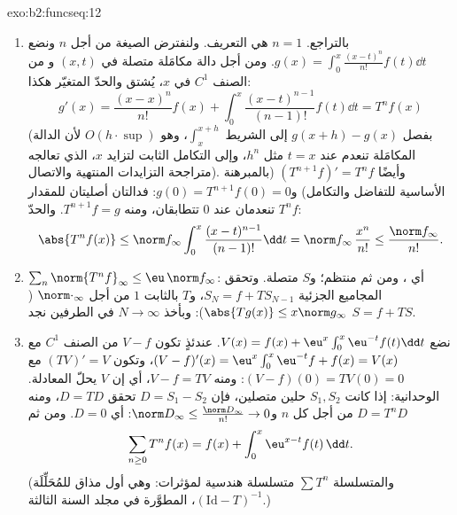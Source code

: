 \begin{solution}{exo:b2:funcseq:12}
\begin{enumerate}
  \item بالتراجع. $n = 1$ هي التعريف. ولنفترض الصيغة
        من أجل $n$ ونضع $g(x) = \int_0^x \frac{(x-t)^n}{n!}
        f(t)\dd t$. ومن أجل دالة مكامَلة متصلة في $(x,t)$ و
        من الصنف $C^1$ في $x$، يُشتق  والحدّ المتغيّر
        هكذا:
        \[
        g'(x) = \frac{(x-x)^n}{n!}f(x)
        + \int_0^x \frac{(x-t)^{n-1}}{(n-1)!}f(t)\dd t
        = T^nf(x)
        \]
        (بفصل $g(x+h) - g(x)$ إلى الشريط
        $\int_x^{x+h}$، وهو $O(h\cdot\sup)$ لأن الدالة المكامَلة تنعدم عند $t = x$ مثل $h^n$، وإلى
        التكامل الثابت لتزايد $x$، الذي تعالجه متراجحة التزايدات
        المنتهية والاتصال). وأيضًا $(T^{n+1}f)' = T^nf$
        (بالمبرهنة الأساسية للتفاضل والتكامل) و$g(0) =
        T^{n+1}f(0) = 0$: فدالتان أصليتان للمقدار $T^nf$ تنعدمان عند
        $0$ تتطابقان، ومنه $T^{n+1}f = g$. والحدّ:
        \[
        \abs{T^nf(x)} \leq \norm f_\infty
        \int_0^x \frac{(x-t)^{n-1}}{(n-1)!}\dd t
        = \norm f_\infty\,\frac{x^n}{n!}
        \leq \frac{\norm f_\infty}{n!} .
        \]
  \item $\sum_n \norm{T^nf}_\infty \leq \eu\,\norm f_\infty$:
        أي ، ومن ثم منتظم؛ و$S$ متصلة.
        وتحقق المجاميع الجزئية $S_N = f + T S_{N-1}$، و$T$
         بالثابت $1$ من أجل $\norm\cdot_\infty$
        ($\abs{Tg(x)} \leq x\norm g_\infty$): وبأخذ $N \to
        \infty$ في الطرفين نجد $S = f + TS$.
  \item نضع $V(x) = f(x) + \eu^x\int_0^x \eu^{-t}f(t)\dd t$.
        عندئذٍ تكون $V - f$ من الصنف $C^1$ مع $(V-f)'(x) =
        \eu^x\int_0^x\eu^{-t}f + f(x) = V(x)$، وتكون $(TV)' = V$
        مع $(V - f)(0) = TV(0) = 0$: ومنه $V - f = TV$، أي إن
        $V$ يحلّ المعادلة. الوحدانية: إذا كانت $S_1, S_2$
        حلين متصلين، فإن $D = S_1 - S_2$ تحقق $D =
        TD$، ومنه $D = T^nD$ من أجل كل $n$ و$\norm D_\infty
        \leq \frac{\norm D_\infty}{n!} \to 0$: أي $D = 0$.
        ومن ثم
        \[
        \sum_{n\geq0} T^nf(x) = f(x) +
        \int_0^x \eu^{x-t}f(t)\,\dd t .
        \]
        (والمتسلسلة $\sum T^n$ متسلسلة هندسية
        لمؤثرات: وهي أول مذاق للمُحَلِّلَة
        $(\mathrm{Id} - T)^{-1}$، المطوَّرة في مجلد السنة
        الثالثة.)
\end{enumerate}
\end{solution}

